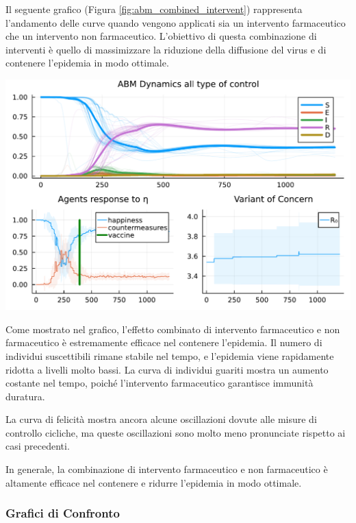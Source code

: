 Il seguente grafico (Figura \ref{fig:abm_combined_intervent}) 
rappresenta l'andamento delle curve quando vengono applicati sia 
un intervento farmaceutico che un intervento non farmaceutico. 
L'obiettivo di questa combinazione di interventi è quello di 
massimizzare la riduzione della diffusione del virus e di contenere 
l'epidemia in modo ottimale.

\begin{minipage}{\linewidth}
    \centering
    \includegraphics[width=\textwidth]{img/SocialNetworkABM_ALL.pdf}
    \label{fig:abm_combined_intervent}
\end{minipage}

Come mostrato nel grafico, l'effetto combinato di intervento 
farmaceutico e non farmaceutico è estremamente efficace nel 
contenere l'epidemia. Il numero di individui suscettibili 
rimane stabile nel tempo, e l'epidemia viene rapidamente ridotta 
a livelli molto bassi. La curva di individui guariti mostra un 
aumento costante nel tempo, poiché l'intervento farmaceutico 
garantisce immunità duratura.

La curva di felicità mostra ancora alcune oscillazioni dovute 
alle misure di controllo cicliche, ma queste oscillazioni sono 
molto meno pronunciate rispetto ai casi precedenti.

In generale, la combinazione di intervento farmaceutico e non 
farmaceutico è altamente efficace nel contenere e ridurre 
l'epidemia in modo ottimale.
\newpage

\subsubsection{Grafici di Confronto}

